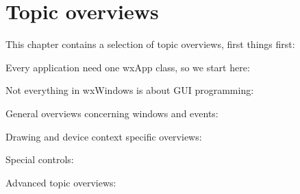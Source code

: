 \chapter{Topic overviews}\label{overviews}
%
\setfooter{\thepage}{}{}{}{}{\thepage}%

This chapter contains a selection of topic overviews, first things first:






Every application need one wxApp class, so we start here:



Not everything in wxWindows is about GUI programming:














General overviews concerning windows and events:










Drawing and device context specific overviews:






Special controls:












Advanced topic overviews:









